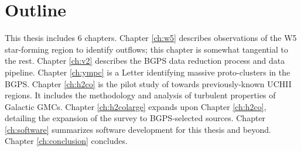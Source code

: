 

\section{Outline}
This thesis includes 6 chapters.
Chapter \ref{ch:w5} describes observations of the W5 star-forming region to identify outflows;
this chapter is somewhat tangential to the rest.
Chapter \ref{ch:v2} describes the BGPS data reduction process and data pipeline.
Chapter \ref{ch:ympc} is a Letter identifying massive proto-clusters in the BGPS.
Chapter \ref{ch:h2co} is the pilot study of \formaldehyde towards previously-known UCHII regions.
It includes the methodology and analysis of turbulent properties of Galactic GMCs.
Chapter \ref{ch:h2colarge} expands upon Chapter \ref{ch:h2co}, detailing the expansion of the \formaldehyde survey
to BGPS-selected sources.
Chapter \ref{ch:software} summarizes software development for this thesis and beyond.
Chapter \ref{ch:conclusion} concludes.



